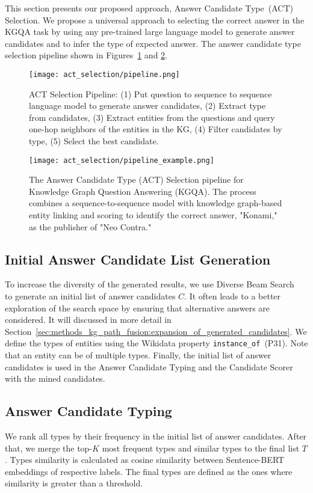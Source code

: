 This section presents our proposed approach, Answer Candidate Type~(ACT) Selection. We propose a universal approach to selecting the correct answer in the KGQA task by using any pre-trained large language model to generate answer candidates and to infer the type of expected answer. The answer candidate type selection pipeline shown in Figures~\ref{fig:act_selection:pipeline} and \ref{fig:act_selection:pipeline_example}.

\begin{figure}[h]
    \centering
    \texttt{[image: act\_selection/pipeline.png]}
    \caption{ACT Selection Pipeline: (1) Put question to sequence to sequence language model to generate answer candidates, (2) Extract type from candidates, (3) Extract entities from the questions and query one-hop neighbors of the entities in the KG, (4) Filter candidates by type, (5) Select the best candidate.}
    \label{fig:act_selection:pipeline}
\end{figure}

\begin{figure}[h]
    \centering
    \texttt{[image: act\_selection/pipeline\_example.png]}
    \caption{The Answer Candidate Type (ACT) Selection pipeline for Knowledge Graph Question Answering (KGQA). The process combines a sequence-to-sequence model with knowledge graph-based entity linking and scoring to identify the correct answer, "Konami," as the publisher of "Neo Contra."}
    \label{fig:act_selection:pipeline_example}
\end{figure}

\subsection{Initial Answer Candidate List Generation} 
To increase the diversity of the generated results, we use Diverse Beam Search~\cite{DBLP:journals/corr/VijayakumarCSSL16-diverse-beam-search} to generate an initial list of answer candidates $C$. It often leads to a better exploration of the search space by ensuring that alternative answers are considered. It will discussed in more detail in Section~\ref{sec:methods_kg_path_fusion:expansion_of_generated_candidates}. We define the types of entities using the Wikidata property \texttt{instance\_of}~(P31). Note that an entity can be of multiple types. Finally, the initial list of answer candidates is used in the Answer Candidate Typing and the Candidate Scorer with the mined candidates. 

\subsection{Answer Candidate Typing} \label{act}
We rank all types by their frequency in the initial list of answer candidates. 
After that, we merge the top-$K$ most frequent types and similar types to the final list $T$.
Types similarity is calculated as cosine similarity between Sentence-BERT~\cite{reimers-2019-sentence-bert} embeddings of respective labels. The final types are defined as the ones where similarity is greater than a threshold.

